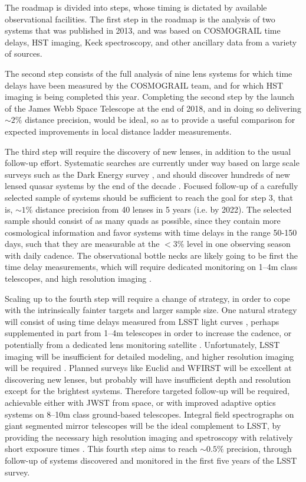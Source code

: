 The roadmap is divided into steps, whose timing is dictated by
available observational facilities.
The first step in the roadmap is the analysis
of two systems that was published in 2013, and was based on COSMOGRAIL time
delays, HST imaging, Keck spectroscopy, and other ancillary data from
a variety of sources.

The second step consists of the full analysis of
nine lens systems for which time delays have been measured by the
COSMOGRAIL team, and for which HST imaging is being completed this
year. Completing the second step by the launch of the James Webb Space
Telescope at the end of 2018,
and in doing so delivering $\sim2\%$ distance precision,
would be ideal, so as to provide a useful
comparison for expected improvements in local distance ladder
measurements.

The third step will require the discovery of new lenses, in addition
to the usual follow-up effort. Systematic searches are currently under
way based on large scale surveys such as the Dark Energy survey
\citep{Agn++15,Mor++16}, and should
discover hundreds of new lensed quasar systems by the
end of the decade \citep{O+M10}.
Focused follow-up of a carefully selected sample of
systems should be sufficient to reach the goal for step 3, that is,
$\sim1\%$ distance precision from 40
lenses in 5 years (i.e. by 2022). The selected sample should
consist of as many quads as possible, since they contain more
cosmological information and favor systems with time delays in the
range 50-150 days, such that they are measurable at the
$<3\%$ level in one observing
season with daily cadence. The observational bottle necks are likely
going to be first the time delay measurements, which will require
dedicated monitoring on 1--4m class telescopes, and high resolution
imaging \citep{Tre++13}.

Scaling up to the fourth step will require a change of strategy, in
order to cope with the intrinsically fainter targets and larger sample
size. One natural strategy will consist of using time delays measured
from LSST light curves \citep{LiaoEtal2015}, perhaps supplemented in
part from 1--4m telescopes in order to increase the cadence, or potentially
from a dedicated lens monitoring satellite
\citep{Mou++08}. Unfortunately, LSST imaging will be insufficient for
detailed modeling, and higher resolution imaging will be required
\citep{Men++15}.
Planned surveys like Euclid and WFIRST will be excellent at
discovering new lenses, but probably will have insufficient depth and
resolution except for the brightest systems. Therefore targeted
follow-up will be required, achievable either with JWST from space, or
with improved adaptive optics systems on 8--10m class ground-based
telescopes. Integral field spectrographs on giant segmented mirror
telescopes will be the ideal complement to LSST, by providing the
necessary high resolution imaging and spetroscopy with relatively
short exposure times
\citep[e.g.][]{Ski++15}.
This fourth step
aims to reach $\sim0.5\%$ precision, through follow-up of systems discovered
and monitored in the first five years of the LSST survey.

